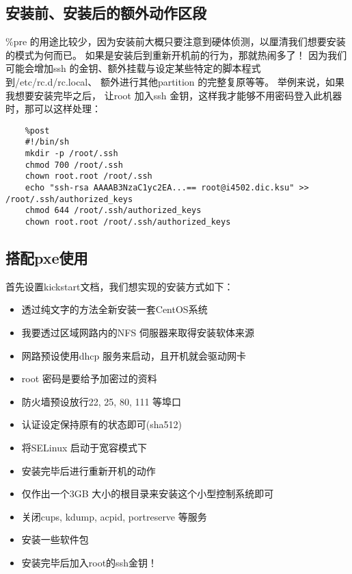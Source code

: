 \documentclass[a4paper,left=1.5cm,right=1.5cm,11pt]{article}
\begin{document}
\subsection{安装前、安装后的额外动作区段}
	\%pre 的用途比较少，因为安装前大概只要注意到硬体侦测，以厘清我们想要安装的模式为何而已。 
	如果是安装后到重新开机前的行为，那就热闹多了！ 
	因为我们可能会增加ssh 的金钥、额外挂载与设定某些特定的脚本程式到/etc/rc.d/rc.local、
	额外进行其他partition 的完整复原等等。 
	举例来说，如果我想要安装完毕之后， 让root 加入ssh 金钥，这样我才能够不用密码登入此机器时，那可以这样处理：
	\begin{lstlisting}
	%post
	#!/bin/sh
	mkdir -p /root/.ssh
	chmod 700 /root/.ssh
	chown root.root /root/.ssh
	echo "ssh-rsa AAAAB3NzaC1yc2EA...== root@i4502.dic.ksu" >> /root/.ssh/authorized_keys
	chmod 644 /root/.ssh/authorized_keys
	chown root.root /root/.ssh/authorized_keys
	\end{lstlisting}

\subsection{搭配pxe使用}
	首先设置kickstart文档，我们想实现的安装方式如下：
	\begin{itemize}
		\item 透过纯文字的方法全新安装一套CentOS系统
		\item 我要透过区域网路内的NFS 伺服器来取得安装软体来源
		\item 网路预设使用dhcp 服务来启动，且开机就会驱动网卡
		\item root 密码是要给予加密过的资料
		\item 防火墙预设放行22, 25, 80, 111 等埠口
		\item 认证设定保持原有的状态即可(sha512)
		\item 将SELinux 启动于宽容模式下
		\item 安装完毕后进行重新开机的动作
		\item 仅作出一个3GB 大小的根目录来安装这个小型控制系统即可
		\item 关闭cups, kdump, acpid, portreserve 等服务
		\item 安装一些软件包
		\item 安装完毕后加入root的ssh金钥！
	\end{itemize}
\end{document}

